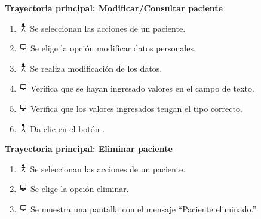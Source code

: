 \textbf{Trayectoria principal: Modificar/Consultar paciente}        
\begin{enumerate}
\item \includegraphics[height=1em]{pictures/actor.png} Se seleccionan las acciones de un paciente.
\item \includegraphics[height=1em]{pictures/sistema.png} Se elige la opción modificar datos personales.
\item \includegraphics[height=1em]{pictures/actor.png} Se realiza modificación de los datos.
\item \includegraphics[height=1em]{pictures/sistema.png} Verifica que se hayan ingresado valores en el campo de texto.
\item \includegraphics[height=1em]{pictures/sistema.png} Verifica que los valores ingresados tengan el tipo correcto.
\item \includegraphics[height=1em]{pictures/actor.png} Da clic en el botón .
\end{enumerate} \bigskip

\textbf{Trayectoria principal: Eliminar paciente}        
\begin{enumerate}
\item \includegraphics[height=1em]{pictures/actor.png} Se seleccionan las acciones de un paciente.
\item \includegraphics[height=1em]{pictures/sistema.png} Se elige la opción eliminar.
\item \includegraphics[height=1em]{pictures/sistema.png} Se muestra una pantalla con el mensaje ``Paciente eliminado.''
\end{enumerate} \bigskip



